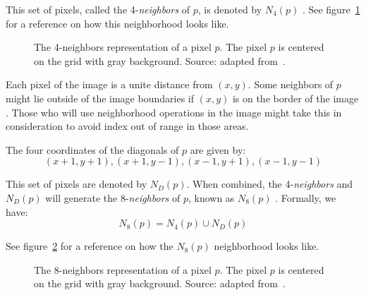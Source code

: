 This set of pixels, called the 4-\textit{neighbors} of $p$, is denoted by $N_4(p)$ \citep{gonzalez:02}. See figure~\ref{fig:n4-neighbors} for a reference on how this neighborhood looks like.

\begin{figure}[ht]
    \centering

    \caption[The 4-neighbors representation of a pixel $p$]{The 4-neighbors representation of a pixel $p$. The pixel $p$ is centered on the grid with gray background. Source: adapted from~\citet{pedrini:08}.}
    \label{fig:n4-neighbors}
\end{figure}

Each pixel of the image is a unite distance from $(x, y)$. Some neighbors of $p$ might lie outside of the image boundaries if $(x, y)$ is on the border of the image \citep{gonzalez:02}. Those who will use neighborhood operations in the image might take this in consideration to avoid index out of range in those areas.

The four coordinates of the diagonals of $p$ are given by:
\begin{equation*}
    (x + 1, y + 1), (x + 1, y - 1), (x - 1, y + 1), (x - 1, y - 1)
    \label{eq:nd_neighbors}
\end{equation*}

This set of pixels are denoted by $N_D(p)$. When combined, the 4-\textit{neighbors} and $N_D(p)$ will generate the 8-\textit{neighbors} of $p$, known as $N_8(p)$ \citep{gonzalez:02}. Formally, we have:
\begin{equation*}
    N_8(p) = N_4(p) \cup N_D(p)
    \label{eq:n8_neighbors}
\end{equation*}

See figure~\ref{fig:n8-neighbors} for a reference on how the $N_8(p)$ neighborhood looks like.

\begin{figure}[ht]
    \centering

    \caption[The 8-neighbors representation of a pixel $p$]{The 8-neighbors representation of a pixel $p$. The pixel $p$ is centered on the grid with gray background. Source: adapted from~\citet{pedrini:08}.}
    \label{fig:n8-neighbors}
\end{figure}

